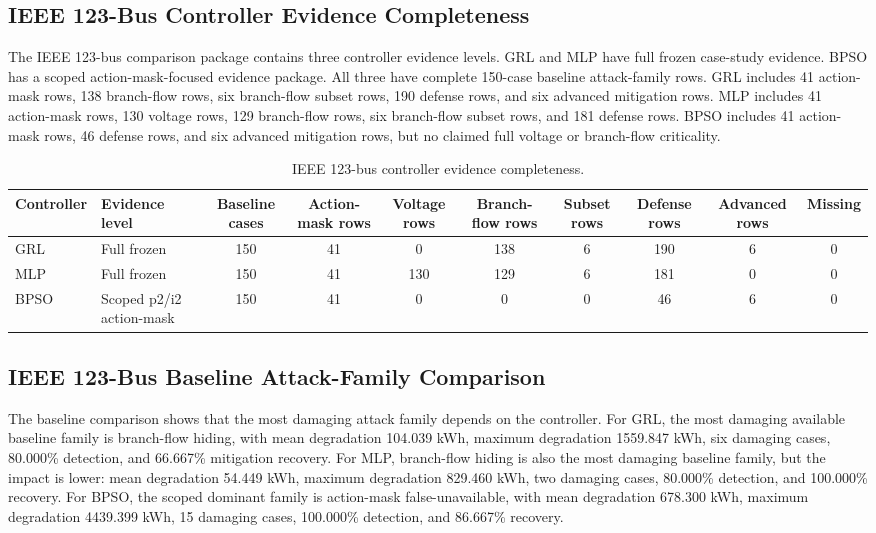 \subsection{IEEE 123-Bus Controller Evidence Completeness}
\label{subsec:ieee123_controller_completeness}

The IEEE 123-bus comparison package contains three controller evidence levels. GRL and MLP have full frozen case-study evidence. BPSO has a scoped action-mask-focused evidence package. All three have complete 150-case baseline attack-family rows. GRL includes 41 action-mask rows, 138 branch-flow rows, six branch-flow subset rows, 190 defense rows, and six advanced mitigation rows. MLP includes 41 action-mask rows, 130 voltage rows, 129 branch-flow rows, six branch-flow subset rows, and 181 defense rows. BPSO includes 41 action-mask rows, 46 defense rows, and six advanced mitigation rows, but no claimed full voltage or branch-flow criticality.

\begin{table}[t]
\centering
\caption{IEEE 123-bus controller evidence completeness.}
\label{tab:ieee123_controller_evidence_completeness}
\scriptsize
\begin{tabular}{llcccccccc}
\hline
Controller & Evidence level & Baseline cases & Action-mask rows & Voltage rows & Branch-flow rows & Subset rows & Defense rows & Advanced rows & Missing \\
\hline
GRL & Full frozen & 150 & 41 & 0 & 138 & 6 & 190 & 6 & 0 \\
MLP & Full frozen & 150 & 41 & 130 & 129 & 6 & 181 & 0 & 0 \\
BPSO & Scoped p2/i2 action-mask & 150 & 41 & 0 & 0 & 0 & 46 & 6 & 0 \\
\hline
\end{tabular}
\end{table}

\subsection{IEEE 123-Bus Baseline Attack-Family Comparison}
\label{subsec:ieee123_controller_attack_family}

The baseline comparison shows that the most damaging attack family depends on the controller. For GRL, the most damaging available baseline family is branch-flow hiding, with mean degradation 104.039 kWh, maximum degradation 1559.847 kWh, six damaging cases, 80.000\% detection, and 66.667\% mitigation recovery. For MLP, branch-flow hiding is also the most damaging baseline family, but the impact is lower: mean degradation 54.449 kWh, maximum degradation 829.460 kWh, two damaging cases, 80.000\% detection, and 100.000\% recovery. For BPSO, the scoped dominant family is action-mask false-unavailable, with mean degradation 678.300 kWh, maximum degradation 4439.399 kWh, 15 damaging cases, 100.000\% detection, and 86.667\% recovery.

